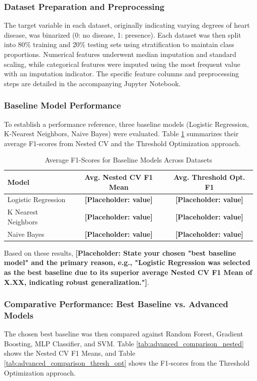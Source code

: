 \documentclass{article}
\begin{document}
\subsubsection{Dataset Preparation and Preprocessing}
The target variable in each dataset, originally indicating varying degrees of heart disease, was binarized (0: no disease, 1: presence). Each dataset was then split into 80\% training and 20\% testing sets using stratification to maintain class proportions. Numerical features underwent median imputation and standard scaling, while categorical features were imputed using the most frequent value with an imputation indicator. The specific feature columns and preprocessing steps are detailed in the accompanying Jupyter Notebook.

\subsubsection{Baseline Model Performance}
To establish a performance reference, three baseline models (Logistic Regression, K-Nearest Neighbors, Naive Bayes) were evaluated. Table \ref{tab:baseline_perf} summarizes their average F1-scores from Nested CV and the Threshold Optimization approach.

\begin{table}[htbp] %
\centering
\caption{Average F1-Scores for Baseline Models Across Datasets}
\label{tab:baseline_perf}
\begin{tabular}{lcc}
\toprule
Model                 & Avg. Nested CV F1 Mean & Avg. Threshold Opt. F1 \\
\midrule
Logistic Regression   & \textbf{[Placeholder: value]} & \textbf{[Placeholder: value]}    \\
K Nearest Neighbors   & \textbf{[Placeholder: value]} & \textbf{[Placeholder: value]}    \\
Naive Bayes           & \textbf{[Placeholder: value]} & \textbf{[Placeholder: value]}    \\
\bottomrule
\end{tabular}
\end{table}

Based on these results, \textbf{[Placeholder: State your chosen "best baseline model" and the primary reason, e.g., "Logistic Regression was selected as the best baseline due to its superior average Nested CV F1 Mean of X.XX, indicating robust generalization."]}.

\subsubsection{Comparative Performance: Best Baseline vs. Advanced Models}
The chosen best baseline was then compared against Random Forest, Gradient Boosting, MLP Classifier, and SVM. Table \ref{tab:advanced_comparison_nested} shows the Nested CV F1 Means, and Table \ref{tab:advanced_comparison_thresh_opt} shows the F1-scores from the Threshold Optimization approach.
\end{document}
